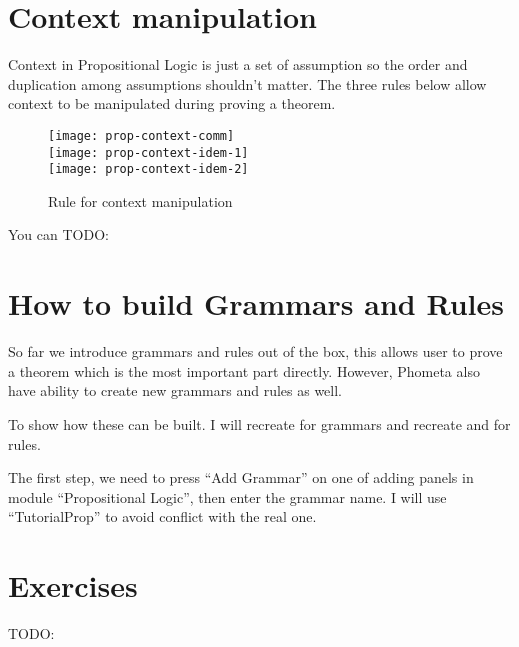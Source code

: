 \documentclass[master.tex]{subfiles}
\begin{document}
\hspace{1ex}

\section{Context manipulation}

Context in Propositional Logic is just a set of assumption so the order and
duplication among assumptions shouldn't matter. The three rules below allow
context to be manipulated during proving a theorem.

\begin{figure}[H]
    \centering
  \texttt{[image: prop-context-comm]}\\
  \texttt{[image: prop-context-idem-1]}\\
  \texttt{[image: prop-context-idem-2]}
\caption{Rule for context manipulation}
\label{fig:prop-context-munipulation}
\end{figure}

You can TODO:

\section{How to build Grammars and Rules}

So far we introduce grammars and rules out of the box, this allows user to prove
a theorem which is the most important part directly. However, Phometa also have
ability to create new grammars and rules as well.

To show how these can be built. I will recreate  for grammars and
recreate  and  for rules.

The first step, we need to press ``Add Grammar'' on one of adding panels in
module ``Propositional Logic'', then enter the grammar name. I will use
``TutorialProp'' to avoid conflict with the real one.

\section{Exercises}
TODO:
\end{document}
